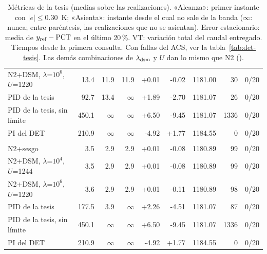 \begin{table}[H]
\begin{tabularx}{\linewidth}{@{}Y r r r r r r r r@{}}
N2+DSM, $\lambda$=$10^6$, $U$=1220 & 13.4 & 11.9 & 11.9 & +0.01 & -0.02 & 1181.00 & 30 & 0/20\\
PID de la tesis & 92.7 & 13.4 & $\infty$ & +1.89 & -2.70 & 1181.07 & 26 & 0/20\\
PID de la tesis, sin límite & 450.1 & $\infty$ & $\infty$ & +6.50 & -9.45 & 1181.07 & 1336 & 0/20\\
PI del DET & 210.9 & $\infty$ & $\infty$ & -4.92 & +1.77 & 1184.55 & 0 & 0/20\\
\addlinespace
{}\\
N2+sesgo & 3.5 & 2.9 & 2.9 & +0.01 & -0.08 & 1180.89 & 99 & 0/20\\
N2+DSM, $\lambda$=$10^4$, $U$=1244 & 3.5 & 2.9 & 2.9 & +0.01 & -0.08 & 1180.89 & 99 & 0/20\\
N2+DSM, $\lambda$=$10^6$, $U$=1220 & 3.6 & 2.9 & 2.9 & +0.01 & -0.11 & 1180.89 & 98 & 0/20\\
PID de la tesis & 177.5 & 3.9 & $\infty$ & +2.26 & -4.51 & 1181.07 & 87 & 0/20\\
PID de la tesis, sin límite & 450.1 & $\infty$ & $\infty$ & +6.50 & -9.45 & 1181.07 & 1336 & 0/20\\
PI del DET & 210.9 & $\infty$ & $\infty$ & -4.92 & +1.77 & 1184.55 & 0 & 0/20\\
\bottomrule
\end{tabularx}
\caption{Métricas de la tesis (medias sobre las realizaciones). «Alcanza»: primer instante con $|e|\le0.30$~K; «Asienta»: instante desde el cual no sale de la banda ($\infty$: nunca; entre paréntesis, las realizaciones que no se asientan). Error estacionario: media de $y_{\rm ref}-\mathrm{PCT}$ en el último 20\,\%. VT: variación total del caudal entregado. Tiempos desde la primera consulta. Con fallas del ACS, ver la
tabla~\ref{tab:det-tesis}. Las demás combinaciones de $\lambda_{\rm dsm}$ y $U$ dan lo mismo que N2 ().}
\label{tab:dsm-lambda}
\end{table}
